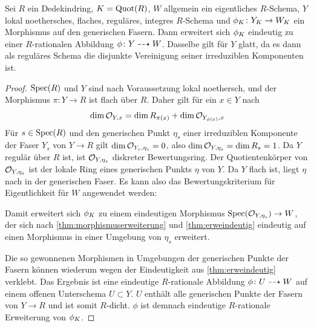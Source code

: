 \begin{Lemma}\label{thm:erwrrational}
  Sei $R$ ein Dedekindring, $K=\operatorname{Quot}(R)$, $W$ allgemein ein
  eigentliches $R$-Schema, $Y$ lokal noethersches, flaches, reguläres,
  integres
  $R$-Schema und ${\phi_{K}\colon Y_{K}\to W_{K}}$ ein Morphismus auf den
  generischen Fasern.
  Dann erweitert sich $\phi_{K}$ eindeutig zu einer
  $R$-rationalen Abbildung ${\phi\colon Y\dashrightarrow W}$.
  Dasselbe gilt für $Y$ glatt, da es dann als reguläres Schema die
  disjunkte Vereinigung seiner irreduziblen Komponenten ist.
  \begin{proof}
    $\operatorname{Spec}(R)$ und $Y$ sind nach Voraussetzung lokal noethersch,
    und der Morphismus ${\pi\colon Y\to R}$ ist flach über $R$. Daher
    gilt für ein $x\in Y$ nach \cite[Theorem~4.3.12]{liu}
    \begin{gather}\label{eq:stalkdimension}
      \dim\mathcal{O}_{Y,x} = \dim R_{\pi(x)} + \dim\mathcal{O}_{Y_{\phi(x)}, x}
    \end{gather}
    Für $s\in\operatorname{Spec}(R)$ und den generischen Punkt $\eta_{s}$ einer
    irreduziblen Komponente der Faser $Y_s$ von $Y\to R$ gilt
    $\dim\mathcal{O}_{Y_s, \eta_{s}}=0$, also $\dim\mathcal{O}_{Y,\eta_{s}}=\dim R_s=1$.
    Da $Y$ regulär über $R$ ist, ist $\mathcal{O}_{Y,\eta_{s}}$ diskreter
    Bewertungsring.
    Der Quotientenkörper von $\mathcal{O}_{Y,\eta_{s}}$ ist der lokale Ring
    eines generischen Punkts $\eta$ von $Y$. Da $Y$ flach
    ist, liegt $\eta$ nach \cite[Proposition~III.9.7]{hartshorne} in
    der generischen Faser.
    Es kann also das Bewertungskriterium für Eigentlichkeit für $W$
    angewendet werden:
    \begin{center}
    \end{center}
    Damit erweitert sich $\phi_{K}$ zu einem eindeutigen Morphismus
    ${\operatorname{Spec}(\mathcal{O}_{Y,\eta_{s}})\to W}$, der sich nach
    \ref{thm:morphismuserweiterung} und \ref{thm:erweindeutig}
    eindeutig auf einen Morphismus in einer Umgebung von $\eta_{s}$
    erweitert.
    
    Die so gewonnenen Morphismen in Umgebungen der generischen Punkte
    der Fasern können wiederum wegen der Eindeutigkeit aus
    \ref{thm:erweindeutig} verklebt. Das Ergebnis ist eine eindeutige
    $R$-rationale Abbildung $\phi\colon U\dashrightarrow W$ auf einem offenen
    Unterschema $U\subset Y$.
    $U$ enthält alle generischen Punkte der Fasern von $Y\to R$ und
    ist somit $R$-dicht.
    $\phi$ ist demnach eindeutige $R$-rationale Erweiterung von
    $\phi_{K}$.
  \end{proof}
\end{Lemma}

